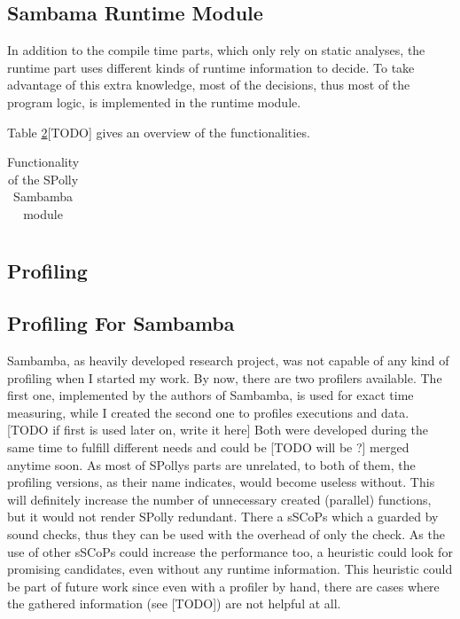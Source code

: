 \red
\begin{shaded}
\section{Sambama Runtime Module}

In addition to the compile time parts, which only rely on static analyses,
the runtime part uses different kinds of runtime information to decide. 
To take advantage of this extra knowledge, most of the decisions, thus most of
the program logic, is implemented in the runtime module. 


Table \ref{}[TODO] gives an overview of the functionalities.

\end{shaded}

\begin{table}[htbp]
  \caption{Functionality of the SPolly Sambamba module}
  \begin{tabular}{| l |}
    \hline
    
    \hline
    \hline

    \hline
  \end{tabular}
\end{table}


\begin{shaded}

\subsection{Profiling}

\end{shaded}

\orange
\begin{shaded}
\section{Profiling For Sambamba}

Sambamba, as heavily developed research project, was not capable of any kind
of profiling when I started my work. By now, there are two profilers available.
The first one, implemented by the authors of Sambamba, 
is used for exact time measuring, while I created the second one to profiles
executions and data.
[TODO if first is used later on, write it here] Both were
developed during the same time to fulfill different needs and could be
[TODO will be ?]  merged anytime soon. 
As most of SPollys parts are unrelated, to both of them, 
the profiling versions, as their name indicates, would become useless without.
This will definitely increase the number of unnecessary created (parallel) 
functions, but it would not render SPolly redundant.
There a sSCoPs which a guarded by sound checks, thus they can be used with the
overhead of only the check. As the use of other sSCoPs could increase the 
performance too, a heuristic could look for promising candidates, even without
any runtime information. This heuristic could be part of future work since even
with a profiler by hand, there are cases where the gathered information
(see [TODO]) are not helpful at all.

\end{shaded}


